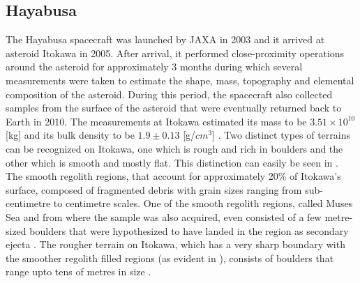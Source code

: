 \subsection{Hayabusa}
\label{subsec:hayabusa_heritage}
The Hayabusa spacecraft was launched by \gls{JAXA} in 2003 and it arrived at asteroid Itokawa in 2005. After arrival, it performed close-proximity operations around the asteroid for approximately 3 months during which several measurements were taken to estimate the shape, mass, topography and elemental composition of the asteroid. During this period, the spacecraft also collected samples from the surface of the asteroid that were eventually returned back to Earth in 2010. The measurements at Itokawa estimated its mass to be $3.51 \times 10^{10}$ [kg] and its bulk density to be $1.9 \pm 0.13$ [g/$cm^3$] \parencite{fujiwara2006ItokawaHayabusa}.
%
\newline\newline
%
Two distinct types of terrains can be recognized on Itokawa, one which is rough and rich in boulders and the other which is smooth and mostly flat. This distinction can easily be seen in . The smooth regolith regions, that account for approximately 20\% of Itokawa's surface, composed of fragmented debris with grain sizes ranging from sub-centimetre to centimetre scales. One of the smooth regolith regions, called Muses Sea and from where the sample was also acquired, even consisted of a few metre-sized boulders that were hypothesized to have landed in the region as secondary ejecta \parencite{miyamotoItokawaRegolith}. The rougher terrain on Itokawa, which has a very sharp boundary with the smoother regolith filled regions (as evident in ), consists of boulders that range upto tens of metres in size \parencite{fujiwara2006ItokawaHayabusa}.
